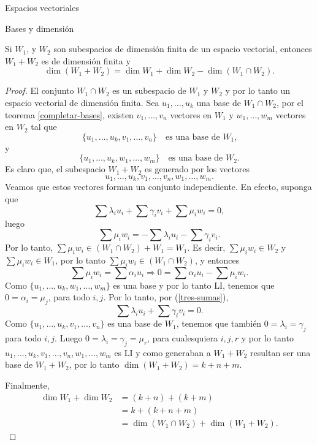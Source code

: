 \begin{chapter}{Espacios vectoriales}
\begin{section}{Bases y dimensi\'on}
    \begin{teorema}
        Si $W_1$, y $W_2$ son subespacios de dimensión finita de un espacio vectorial, entonces $W_1+ W_2$ es de dimensión finita y 
        $$ \dim (W_1 + W_2) = \dim W_1 + \dim W_2 - \dim (W_1 \cap W_2).$$
    \end{teorema}
    \begin{proof}
         El  conjunto $W_1 \cap W_2$  es un subespacio de $W_1$ y $W_2$ y por lo tanto un espacio vectorial de dimensión finita. Sea  $u_1,\ldots,u_k$ una base de $W_1 \cap W_2$, por el teorema \ref{completar-bases},  existen $v_1,\ldots,v_n$ vectores en $W_1$ y $w_1,\ldots,w_m$ vectores en $W_2$  tal que
         $$
         \{u_1,\ldots,u_k,v_1,\ldots,v_n\}\quad  \text{es una base de $W_1$,}
         $$
          y
          $$
         \{u_1,\ldots,u_k,w_1,\ldots,w_m\}\quad \text{es una base de $W_2$.}
         $$
        Es claro que, el subespacio $W_1+ W_2$ es generado por los vectores 
        $$
        u_1,\ldots,u_k,v_1,\ldots,v_n,w_1,\ldots,w_m.
        $$
        Veamos que estos  vectores forman un conjunto independiente. En efecto, suponga que
        \begin{equation}\label{tres-sumas}
            \sum \lambda_i u_i + \sum \gamma_i v_i + \sum \mu_i w_i =0,
        \end{equation}
        luego
        $$
        \sum \mu_i w_i = - \sum \lambda_i u_i - \sum \gamma_i v_i.
        $$
        Por  lo tanto, $\sum \mu_i w_i \in (W_1 \cap W_2) + W_1 = W_1$. Es  decir,  $\sum \mu_i w_i \in W_2$ y $\sum \mu_i w_i \in W_1$, por lo tanto $\sum \mu_i w_i \in (W_1 \cap W_2)$, y entonces
        $$
        \sum \mu_i w_i  = \sum \alpha_i u_i \Rightarrow 0 = \sum \alpha_i u_i - \sum \mu_i w_i .
        $$
        Como $\{u_1,\ldots,u_k,w_1,\ldots,w_m\}$ es una base y por lo tanto LI, tenemos que $0=\alpha_i=\mu_j$, para todo $i,j$. Por lo tanto, por (\ref{tres-sumas}), 
        \begin{equation}\label{dos-sumas}
        \sum \lambda_i u_i + \sum \gamma_i v_i  =0.
        \end{equation}
        Como $ \{u_1,\ldots,u_k,v_1,\ldots,v_n\}$  es una base de $W_1$,  tenemos que también $0=\lambda_i = \gamma_j$ para todo $i,j$. Luego  $0=\lambda_i = \gamma_j = \mu_r$, para cualesquiera $i,j,r$ y por lo tanto $u_1,\ldots,u_k,v_1,\ldots,v_n,w_1,\ldots,w_m$ es LI y  como  generaban a  $W_1+W_2$ resultan ser una base de $W_1+W_2$, por lo tanto $\dim (W_1+W_2) = k+n+m$.
        
        Finalmente,
        \begin{align*}
            \dim W_1 + \dim W_2&= (k+n)+(k+m) \\&	=k+(k+n+m)\\ &=  \dim (W_1 \cap W_2) + \dim (W_1 + W_2) .
        \end{align*}
    \end{proof}
    \end{section}




\end{chapter}
